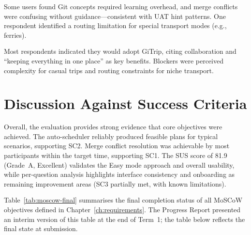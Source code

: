 Some users found Git concepts required learning overhead, and merge conflicts were confusing without guidance---consistent with UAT hint patterns. One respondent identified a routing limitation for special transport modes (e.g., ferries).

Most respondents indicated they would adopt GiTrip, citing collaboration and ``keeping everything in one place'' as key benefits. Blockers were perceived complexity for casual trips and routing constraints for niche transport.

\section{Discussion Against Success Criteria}
Overall, the evaluation provides strong evidence that core objectives were
achieved. The auto-scheduler reliably produced feasible plans for typical
scenarios, supporting SC2. Merge conflict resolution was achievable by most
participants within the target time, supporting SC1. The SUS score of 81.9
(Grade~A, Excellent) validates the Easy mode approach and overall usability,
while per-question analysis highlights interface consistency and onboarding as
remaining improvement areas (SC3 partially met, with known limitations).

Table~\ref{tab:moscow-final} summarises the final completion status of all
MoSCoW objectives defined in Chapter~\ref{ch:requirements}. The Progress
Report presented an interim version of this table at the end of Term~1; the
table below reflects the final state at submission.

